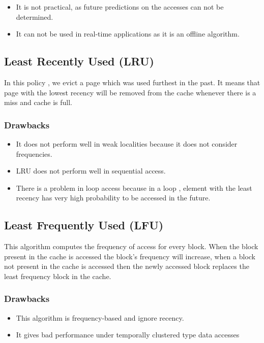 \documentclass[conference]{IEEEtran}
\begin{document}
\begin{itemize}
    \item It is not practical, as future predictions on the accesses can not be determined.
    \item  It can not be used in real-time applications as it is an offline algorithm.
\end{itemize}

\subsection{\textbf{Least Recently Used (LRU)}}

In this policy , we evict a page which was used furthest in the past. It means that page with the lowest recency will be removed from the cache whenever there is a miss and cache is full.
\\
\subsubsection*{Drawbacks}

\begin{itemize}
    \item It does not perform well in weak localities because it does not consider frequencies.
    \item  LRU does not perform well in sequential access.
    \item There is a problem in loop access because in a loop , element with the least recency has very high probability to be accessed in the future.

\end{itemize}

\subsection{\textbf{Least Frequently Used (LFU)}}

This algorithm computes the frequency of access for every block. When the block 
present in the cache is accessed the block’s frequency will increase, when a block 
not present in the cache is accessed then the newly accessed block replaces the 
least frequency block in the cache.
\\
\subsubsection*{Drawbacks}

\begin{itemize}
    \item This algorithm is frequency-based and ignore recency.
    \item It gives bad performance under temporally clustered type data accesses

\end{itemize}
\end{document}
